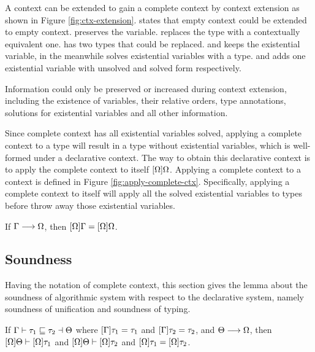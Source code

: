 A context can be extended to gain a complete context by context extension as shown in Figure \ref{fig:ctx-extension}.  states that empty context could be extended to empty context.  preserves the variable.  replaces the type with a contextually equivalent one.  has two types that could be replaced.  and  keeps the existential variable, in the meanwhile  solves existential variables with a type.  and  adds one existential variable with unsolved and solved form respectively.

Information could only be preserved or increased during context extension, including the existence of variables, their relative orders, type annotations, solutions for existential variables and all other information.

Since complete context has all existential variables solved, applying a complete context to a type will result in a type without existential variables, which is well-formed under a declarative context. The way to obtain this declarative context is to apply the complete context to itself $[\Omega]\Omega$. Applying a complete context to a context is defined in Figure \ref{fig:apply-complete-ctx}. Specifically, applying a complete context to itself will apply all the solved existential variables to types before throw away those existential variables.

\begin{lemma}
  \label{lemma:stability-of-complete-context}

  If $\Gamma \longrightarrow \Omega$, then $[\Omega]\Gamma = [\Omega]\Omega$.
\end{lemma}

\subsection{Soundness}

Having the notation of complete context, this section gives the lemma about the soundness of algorithmic system with respect to the declarative system, namely soundness of unification and soundness of typing.

\begin{theorem}

If $\Gamma \vdash \tau_1 \sqsubseteq \tau_2 \dashv \Theta$ where $[\Gamma] \tau_1 = \tau_1$ and $[\Gamma] \tau_2 = \tau_2$,
and $\Theta \longrightarrow \Omega$,
then $[\Omega]\Theta \vdash [\Omega]\tau_1$ and $[\Omega]\Theta \vdash [\Omega]\tau_2$ and $[\Omega]\tau_1 = [\Omega]\tau_2$.
\end{theorem}

